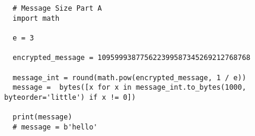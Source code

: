 \documentclass[11pt, nopagenumbers]{adamblan-hw}
\begin{document}
\begin{lstlisting}
  # Message Size Part A
  import math

  e = 3

  encrypted_message = 109599938775622399587345269212768768

  message_int = round(math.pow(encrypted_message, 1 / e))
  message =  bytes([x for x in message_int.to_bytes(1000, byteorder='little') if x != 0])

  print(message)
  # message = b'hello'
\end{lstlisting}
\end{document}
